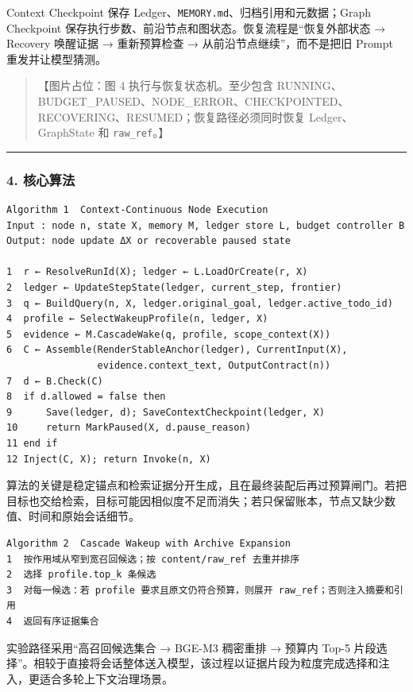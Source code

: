 \documentclass[UTF8,a4paper,12pt]{ctexart}
\begin{document}
Context Checkpoint 保存 Ledger、\texttt{MEMORY.md}、归档引用和元数据；Graph Checkpoint 保存执行步数、前沿节点和图状态。恢复流程是``恢复外部状态 → Recovery 唤醒证据 → 重新预算检查 → 从前沿节点继续''，而不是把旧 Prompt 重发并让模型猜测。

\begin{quote}
【图片占位：图 4 执行与恢复状态机。至少包含 RUNNING、BUDGET\_PAUSED、NODE\_ERROR、CHECKPOINTED、RECOVERING、RESUMED；恢复路径必须同时恢复 Ledger、GraphState 和 \texttt{raw\_ref}。】
\end{quote}

\begin{center}\rule{0.5\linewidth}{0.5pt}\end{center}

\subsubsection{4. 核心算法}

\begin{verbatim}
Algorithm 1  Context-Continuous Node Execution
Input : node n, state X, memory M, ledger store L, budget controller B
Output: node update ΔX or recoverable paused state

1  r ← ResolveRunId(X); ledger ← L.LoadOrCreate(r, X)
2  ledger ← UpdateStepState(ledger, current_step, frontier)
3  q ← BuildQuery(n, X, ledger.original_goal, ledger.active_todo_id)
4  profile ← SelectWakeupProfile(n, ledger, X)
5  evidence ← M.CascadeWake(q, profile, scope_context(X))
6  C ← Assemble(RenderStableAnchor(ledger), CurrentInput(X),
                evidence.context_text, OutputContract(n))
7  d ← B.Check(C)
8  if d.allowed = false then
9      Save(ledger, d); SaveContextCheckpoint(ledger, X)
10     return MarkPaused(X, d.pause_reason)
11 end if
12 Inject(C, X); return Invoke(n, X)
\end{verbatim}

算法的关键是稳定锚点和检索证据分开生成，且在最终装配后再过预算闸门。若把目标也交给检索，目标可能因相似度不足而消失；若只保留账本，节点又缺少数值、时间和原始会话细节。

\begin{verbatim}
Algorithm 2  Cascade Wakeup with Archive Expansion
1  按作用域从窄到宽召回候选；按 content/raw_ref 去重并排序
2  选择 profile.top_k 条候选
3  对每一候选：若 profile 要求且原文仍符合预算，则展开 raw_ref；否则注入摘要和引用
4  返回有序证据集合
\end{verbatim}

实验路径采用``高召回候选集合 → BGE-M3 稠密重排 → 预算内 Top-5 片段选择''。相较于直接将会话整体送入模型，该过程以证据片段为粒度完成选择和注入，更适合多轮上下文治理场景。
\end{document}
